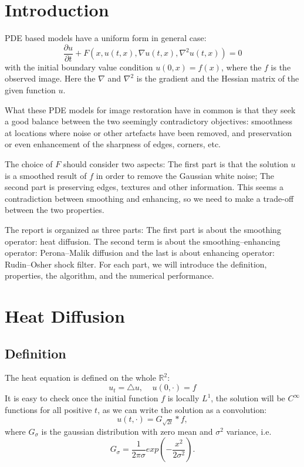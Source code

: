 \documentclass{article}
\title{\showtitle}
\author{\showauthor}
\begin{document}
\maketitle
\thispagestyle{fancy}
\section{Introduction}
     PDE based models have a uniform form in general case:
\begin{equation}
\frac{\partial u}{\partial t} + F(x,u(t,x), \nabla u(t,x), \nabla^2 u(t,x)) = 0
\end{equation}
with the initial boundary value condition $u(0,x) = f(x)$, where the $f$ is the observed image. Here the $\nabla$ and $\nabla^2$ is the gradient and the Hessian matrix of the given function $u$. 

What these PDE models for image restoration have in common is that they seek a good balance
between the two seemingly contradictory objectives: smoothness at locations where
noise or other artefacts have been removed, and preservation or even enhancement of
the sharpness of edges, corners, etc.

The choice of $F$ should consider two aspects: The first part is that the solution $u$ is a smoothed result of $f$ in order to remove the Gaussian white noise; The second part is preserving edges, textures and other information. This seems a contradiction between smoothing and enhancing, so we need to make a trade-off between the two properties. 

The report is organized as three parts: The first part is about the smoothing operator: heat diffusion. The second term is about the smoothing--enhancing operator: Perona--Malik diffusion and the last is about enhancing operator: Rudin--Osher shock filter. For each part, we will introduce the definition, properties, the algorithm, and the numerical performance. 

\section{Heat Diffusion}
\subsection{Definition}
The heat equation is defined on the whole $\mathbb R^2$:
\begin{equation}
u_t = \triangle u ,~~~~~ u(0,\cdot) = f
\end{equation}
It is easy to check once the initial function $f$ is locally $L^1$, the solution will be $C^\infty$ functions for all positive $t$, as we can write the solution as a convolution:
\begin{equation}
u(t,\cdot) = G_{\sqrt{2t}} * f,
\end{equation}
where $G_{\sigma}$ is the gaussian distribution with zero mean and $\sigma^2$ variance, i.e. $$G_\sigma = \frac{1}{2\pi\sigma}exp(-\frac{x^2}{2\sigma^2}).$$
\end{document}
